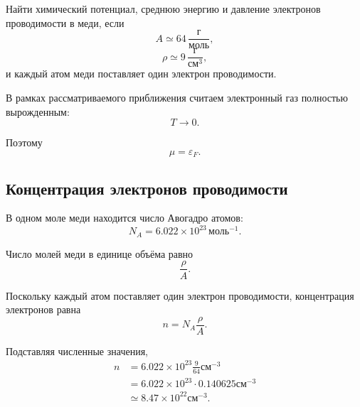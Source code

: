 \documentclass[../final.tex]{subfiles}
\begin{document}

\newpage
{}

\condition

Найти химический потенциал, среднюю энергию и давление
электронов проводимости в меди, если
%
\begin{equation*}
    A
    \simeq
    64\,
    \frac{
        \text{г}
    }{
        \text{моль}
    },
\end{equation*}
%
%
\begin{equation*}
    \rho
    \simeq
    9\,
    \frac{
        \text{г}
    }{
        \text{см}^3
    },
\end{equation*}
%
и каждый атом меди поставляет один электрон проводимости.

В рамках рассматриваемого приближения считаем электронный газ
полностью вырожденным:
%
\begin{equation*}
    T\to0.
\end{equation*}

Поэтому
%
\begin{equation*}
    \mu
    =
    \varepsilon_F.
\end{equation*}



\subsection*{Концентрация электронов проводимости}

В одном моле меди находится число Авогадро атомов:
%
\begin{equation*}
    N_A
    =
    6.022\times10^{23}\,
    \text{моль}^{-1}.
\end{equation*}

Число молей меди в единице объёма равно
%
\begin{equation*}
    \frac{\rho}{A}.
\end{equation*}

Поскольку каждый атом поставляет один электрон проводимости,
концентрация электронов равна
%
\begin{equation*}
    n
    =
    N_A
    \frac{\rho}{A}.
\end{equation*}

Подставляя численные значения,
%
\begin{align*}
    n
    &=
    6.022\times10^{23}
    \frac{
        9
    }{
        64
    }
    \text{см}^{-3}
    \\[3pt]
    &=
    6.022\times10^{23}
    \cdot
    0.140625
    \text{см}^{-3}
    \\[3pt]
    &\simeq
    8.47\times10^{22}
    \text{см}^{-3}.
\end{align*}
\end{document}
